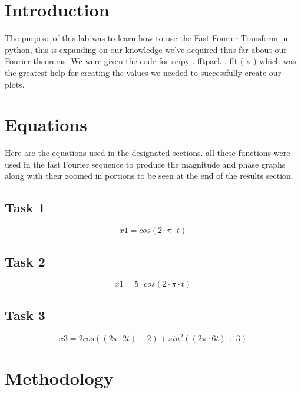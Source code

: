 \documentclass[12pt]{report}
\begin{document}
\section{Introduction}
 
The purpose of this lab was to learn how to use the Fast Fourier Transform in python, this is expanding on our knowledge we've acquired thus far about our Fourier theorems. We were given the code for  scipy . fftpack . fft ( x ) which was the greatest help for creating the values we needed to successfully create our plots. 

\section{Equations}

Here are the equations used in the designated sections. all these functions were used in the fast Fourier sequence to produce the magnitude and phase graphs along with their zoomed in portions to be seen at the end of the results section.  

\subsection{Task 1}

\begin{equation*}
x1 = cos(2\cdot \pi \cdot t)
\end{equation*}

\subsection{Task 2}

\begin{equation*}
x1 = 5 \cdot cos(2\cdot \pi \cdot t)
\end{equation*}

\subsection{Task 3}

\begin{equation*}
x3 = 2cos((2π · 2t) − 2) + sin^2((2π · 6t) + 3)
\end{equation*}

\section{Methodology}
\end{document}
